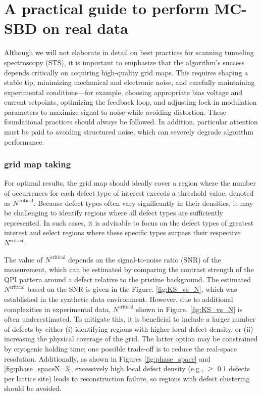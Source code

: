 \section{A practical guide to perform MC-SBD on real data} \label{sec:guide}
Although we will not elaborate in detail on best practices for scanning tunneling spectroscopy (STS), it is important to emphasize that the algorithm’s success depends critically on acquiring high-quality grid maps. This requires shaping a stable tip, minimizing mechanical and electronic noise, and carefully maintaining experimental conditions—for example, choosing appropriate bias voltage and current setpoints, optimizing the feedback loop, and adjusting lock-in modulation parameters to maximize signal-to-noise while avoiding distortion. These foundational practices should always be followed. In addition, particular attention must be paid to avoiding structured noise, which can severely degrade algorithm performance.

\subsubsection{grid map taking}
For optimal results, the grid map should ideally cover a region where the number of occurrences for each defect type of interest exceeds a threshold value, denoted as $N^{\text{critical}}$. Because defect types often vary significantly in their densities, it may be challenging to identify regions where all defect types are sufficiently represented. In such cases, it is advisable to focus on the defect types of greatest interest and select regions where these specific types surpass their respective $N^{\text{critical}}$.

The value of $N^{\text{critical}}$ depends on the signal-to-noise ratio (SNR) of the measurement, which can be estimated by comparing the contrast strength of the QPI pattern around a defect relative to the pristine background. The estimated $N^{\text{critical}}$ based on the SNR is given in the Figure. \ref{fig:KS_vs_N}, which was established in the synthetic data environment. However, due to additional complexities in experimental data, $N^{\text{critical}}$ shown in Figure. \ref{fig:KS_vs_N} is often underestimated. To mitigate this, it is beneficial to include a larger number of defects by either (i) identifying regions with higher local defect density, or (ii) increasing the physical coverage of the grid. The latter option may be constrained by cryogenic holding time; one possible trade-off is to reduce the real-space resolution. Additionally, as shown in Figures \ref{fig:phase_space} and \ref{fig:phase_spaceN=3}, excessively high local defect density (e.g., $\geq$ 0.1 defects per lattice site) leads to reconstruction failure, so regions with defect clustering should be avoided.

